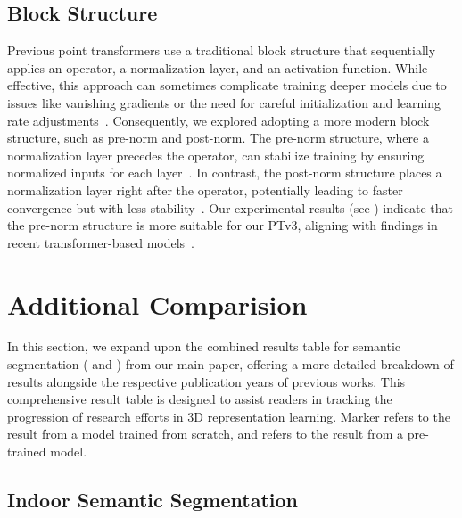 \subsection{Block Structure}
Previous point transformers use a traditional block structure that sequentially applies an operator, a normalization layer, and an activation function. While effective, this approach can sometimes complicate training deeper models due to issues like vanishing gradients or the need for careful initialization and learning rate adjustments~\cite{xiong2020layer}. Consequently, we explored adopting a more modern block structure, such as pre-norm and post-norm. The pre-norm structure, where a normalization layer precedes the operator, can stabilize training by ensuring normalized inputs for each layer~\cite{child2019generating}. In contrast, the post-norm structure places a normalization layer right after the operator, potentially leading to faster convergence but with less stability~\cite{vaswani2017attention}. Our experimental results (see ) indicate that the pre-norm structure is more suitable for our PTv3, aligning with findings in recent transformer-based models~\cite{xiong2020layer}.

\section{Additional Comparision}
In this section, we expand upon the combined results table for semantic segmentation ( and ) from our main paper, offering a more detailed breakdown of results alongside the respective publication years of previous works. This comprehensive result table is designed to assist readers in tracking the progression of research efforts in 3D representation learning. Marker \scratch refers to the result from a model trained from scratch, and \pretrain refers to the result from a pre-trained model.

\subsection{Indoor Semantic Segmentation}

